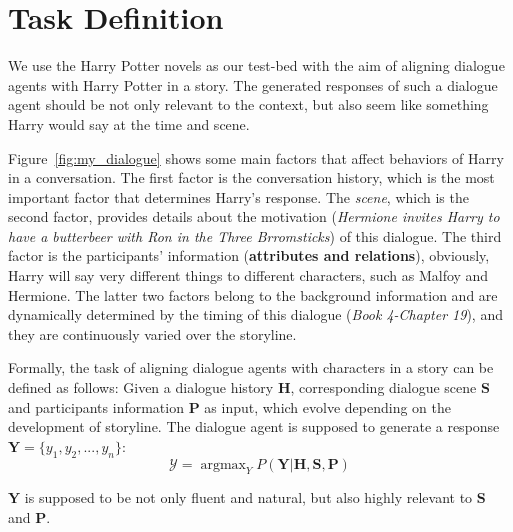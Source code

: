 \documentclass[11pt]{article}
\DeclareMathOperator*{\argmax}{argmax} \usepackage{amssymb}
\begin{document}
%
 



\section{Task Definition}
\label{task_definition}

We use the Harry Potter novels as our test-bed with the aim of aligning dialogue agents with Harry Potter in a story.
The generated responses of such a dialogue agent should be not only relevant to the context, but also seem like something Harry would say at the time and scene.



Figure~\ref{fig:my_dialogue} shows some main factors that affect behaviors of Harry in a conversation.  The first factor is the conversation history, which is the most important factor that determines Harry's response. 
The \textit{scene}, which is the second factor, provides details about the motivation (\textit{Hermione invites Harry to have a butterbeer with Ron in the Three Brromsticks}) of this dialogue. 
The third factor is the participants' information (\textbf{attributes and relations}), obviously, Harry will say very different things to different characters, such as Malfoy and Hermione.
The latter two factors belong to the background information and are dynamically determined by the timing of this dialogue (\textit{Book 4-Chapter 19}), and they are continuously varied over the storyline. 






Formally, the task of aligning dialogue agents with characters in a story can be defined as follows: Given a dialogue history $\mathbf{H}$,  corresponding dialogue scene $\mathbf{S}$ and participants information $\mathbf{P}$ as input, which evolve depending on the development of storyline.
The dialogue agent  is supposed to generate a  response $\mathbf{Y} = \{y_1, y_2,...,y_n\}$:
\begin{equation*}
    \mathcal{Y} = \argmax_Y  \textit{P}(\mathbf{Y}|\mathbf{H},\mathbf{S},\mathbf{P})
\end{equation*}

$\mathbf{Y}$ is supposed   to be not only fluent and natural, but also  highly relevant to $\mathbf{S}$ and $\mathbf{P}$.
\end{document}
